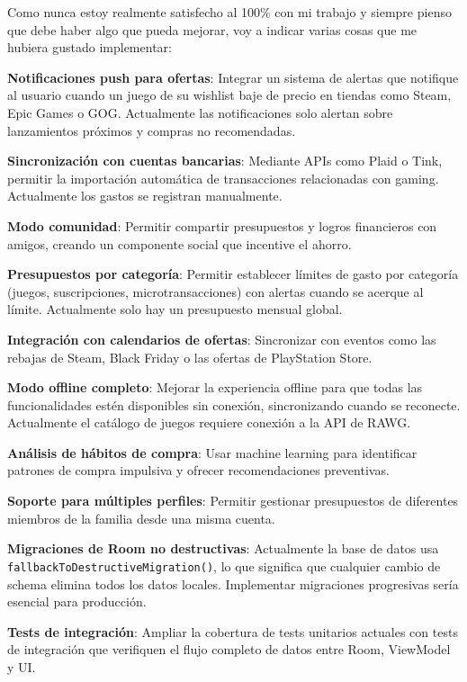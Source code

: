 \documentclass[
  spanish,
  11pt,
  paper=a4,
  ,captions=tableheading
]{scrartcl}
\begin{document}
Como nunca estoy realmente satisfecho al 100\% con mi trabajo y siempre
pienso que debe haber algo que pueda mejorar, voy a indicar varias cosas
que me hubiera gustado implementar:

\textbf{Notificaciones push para ofertas}: Integrar un sistema de
alertas que notifique al usuario cuando un juego de su wishlist baje de
precio en tiendas como Steam, Epic Games o GOG. Actualmente las
notificaciones solo alertan sobre lanzamientos próximos y compras no
recomendadas.

\textbf{Sincronización con cuentas bancarias}: Mediante APIs como Plaid
o Tink, permitir la importación automática de transacciones relacionadas
con gaming. Actualmente los gastos se registran manualmente.

\textbf{Modo comunidad}: Permitir compartir presupuestos y logros
financieros con amigos, creando un componente social que incentive el
ahorro.

\textbf{Presupuestos por categoría}: Permitir establecer límites de
gasto por categoría (juegos, suscripciones, microtransacciones) con
alertas cuando se acerque al límite. Actualmente solo hay un presupuesto
mensual global.

\textbf{Integración con calendarios de ofertas}: Sincronizar con eventos
como las rebajas de Steam, Black Friday o las ofertas de PlayStation
Store.

\textbf{Modo offline completo}: Mejorar la experiencia offline para que
todas las funcionalidades estén disponibles sin conexión, sincronizando
cuando se reconecte. Actualmente el catálogo de juegos requiere conexión
a la API de RAWG.

\textbf{Análisis de hábitos de compra}: Usar machine learning para
identificar patrones de compra impulsiva y ofrecer recomendaciones
preventivas.

\textbf{Soporte para múltiples perfiles}: Permitir gestionar
presupuestos de diferentes miembros de la familia desde una misma
cuenta.

\textbf{Migraciones de Room no destructivas}: Actualmente la base de
datos usa \texttt{fallbackToDestructiveMigration()}, lo que significa
que cualquier cambio de schema elimina todos los datos locales.
Implementar migraciones progresivas sería esencial para producción.

\textbf{Tests de integración}: Ampliar la cobertura de tests unitarios
actuales con tests de integración que verifiquen el flujo completo de
datos entre Room, ViewModel y UI.
\end{document}
